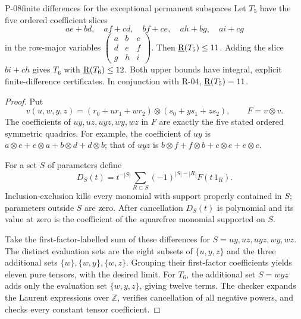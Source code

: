 \begin{finding}{P-08}{finite differences for the exceptional permanent subspaces}
Let \(T_5\) have the five ordered coefficient slices
\[
 ae+bd,\quad af+cd,\quad bf+ce,\quad ah+bg,\quad ai+cg
\]
in the row-major variables
\(\left(\begin{smallmatrix}a&b&c\\d&e&f\\g&h&i\end{smallmatrix}\right)\).
Then \(\underline{\mathrm R}(T_5)\leq11\).
Adding the slice \(bi+ch\) gives \(T_6\) with
\(\underline{\mathrm R}(T_6)\leq12\).
Both upper bounds have integral, explicit finite-difference
certificates. In conjunction with R-04, \(\underline{\mathrm R}(T_5)=11\).
\end{finding}
\begin{proof}
Put
\[
 v(u,w,y,z)=(r_0+u r_1+w r_2)\otimes(s_0+y s_1+z s_2),
 \qquad F=v\otimes v.
\]
The coefficients of \(uy,uz,uyz,wy,wz\) in \(F\) are
exactly the five stated ordered symmetric quadrics.
For example, the coefficient of \(uy\) is
\(a\otimes e+e\otimes a+b\otimes d+d\otimes b\);
that of \(uyz\) is
\(b\otimes f+f\otimes b+c\otimes e+e\otimes c\).

For a set \(S\) of parameters define
\[
 D_S(t)=t^{-|S|}
 \sum_{R\subset S}(-1)^{|S|-|R|}F(t\,1_R).
\]
Inclusion-exclusion kills every monomial with support
properly contained in \(S\); parameters outside \(S\)
are zero. After cancellation \(D_S(t)\) is polynomial
and its value at zero is the coefficient of the
squarefree monomial supported on \(S\).

Take the first-factor-labelled sum of these differences
for \(S=uy,uz,uyz,wy,wz\).
The distinct evaluation sets are the eight subsets of
\(\{u,y,z\}\) and the three additional sets
\(\{w\},\{w,y\},\{w,z\}\). Grouping their first-factor
coefficients yields eleven pure tensors, with the desired
limit. For \(T_6\), the additional set \(S=wyz\) adds only
the evaluation set \(\{w,y,z\}\), giving twelve terms.
The checker  expands
the Laurent expressions over \(\mathbb Z\), verifies
cancellation of all negative powers, and checks every
constant tensor coefficient.
\end{proof}

